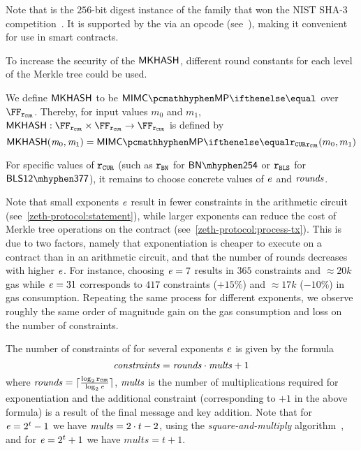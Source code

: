 \begin{remark}
    Note that  is the $256$-bit digest instance of the \keccak{} family that won the NIST SHA-3 competition~\cite{keccak-submission}. It is supported by the \evm via an opcode (see~\cite[Appendix G]{wood2014ethereum}), making it convenient for use in smart contracts.
\end{remark}

\begin{remark}
    To increase the security of the $\mathsf{\mathsf{MKHASH}}$, different round constants for each level of the Merkle tree could be used.
\end{remark}

We define $\mathsf{MKHASH}$ to be $\mimcMPPrime{}$ over $\FFx{\rCURVE}$. Thereby, for input values $m_0$ and $m_1$, $\mkhash : \FFx{\rCURVE} \times \FFx{\rCURVE} \to \FFx{\rCURVE}$ is defined by
\begin{equation}\label{instantiation:eq:mkhash-instantiation}
    \mkhash(\msg_0, \msg_1) = \mimcMPPrime{\rCURVE}(m_0, m_1)
\end{equation}

For specific values of $\mathtt{r_{CUR}}$ (such as $\mathtt{r_{BN}}$ for $\BNCurve$ or $\mathtt{r_{BLS}}$ for $\BLSCurve$), it remains to choose concrete values of $\mathit{e}{}$ and $\mathit{rounds}{}$.

\newcommand{\constraints}{\varstyle{constraints}}

Note that small exponents $\mathit{e}{}$ result in fewer constraints in the arithmetic circuit (see~\cref{zeth-protocol:statement}), while larger exponents can reduce the cost of Merkle tree operations on the contract (see~\cref{zeth-protocol:process-tx}). This is due to two factors, namely that exponentiation is cheaper to execute on a contract than in an arithmetic circuit, and that the number of rounds decreases with higher $\mathit{e}{}$. For instance, choosing $\mathit{e}{} = 7$ results in $365$ constraints and $\approx 20k$ gas while $\mathit{e}{} = 31$ corresponds to $417$ constraints ($+15\%$) and $\approx 17k$ ($-10\%$) in gas consumption. Repeating the same process for different exponents, we observe roughly the same order of magnitude gain on the gas consumption and loss on the number of constraints.

The number of constraints of \mimcMPPrime{} for several exponents $\mathit{e}{}$ is given by the formula
\[
    \constraints = \rounds \cdot \mults + 1
\]
where $\mathit{rounds} = \lceil \frac{\log_2 \mathtt{r_{CUR}}}{\log_2 \mathit{e}{}} \rceil$, $\mathit{mults}$ is the number of multiplications required for exponentiation and the additional constraint (corresponding to $+1$ in the above formula) is a result of the final message and key addition. Note that for $\mathit{e} = 2^t - 1$ we have $\mathit{mults} = 2 \cdot t - 2$, using the \emph{square-and-multiply} algorithm~\cite{menezes1996handbook}, and for $\mathit{e} = 2^t + 1$ we have $mults = t + 1$.

